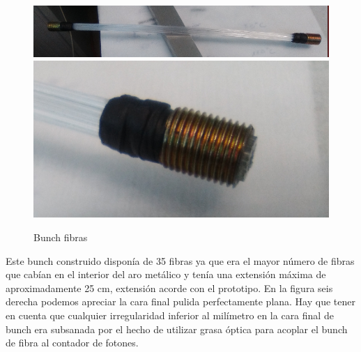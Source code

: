 \begin{figure}[htb]
\centering
{
\includegraphics[scale=0.3]{bunchfibras.png} 
}
{
\includegraphics[scale=0.3]{bunchfibras1.png} 
}
\caption{Bunch fibras\label{Bunch}}
\end{figure} 

Este bunch construido disponía de 35 fibras ya que era el mayor número de fibras que cabían en el interior del aro metálico y tenía una extensión máxima de aproximadamente 25 cm, extensión acorde con el prototipo. En la figura seis derecha podemos apreciar la cara final pulida perfectamente plana. Hay que tener en cuenta que cualquier irregularidad inferior al milímetro en la cara final de bunch era subsanada por el hecho de utilizar grasa óptica para acoplar el bunch de fibra al contador de fotones.
